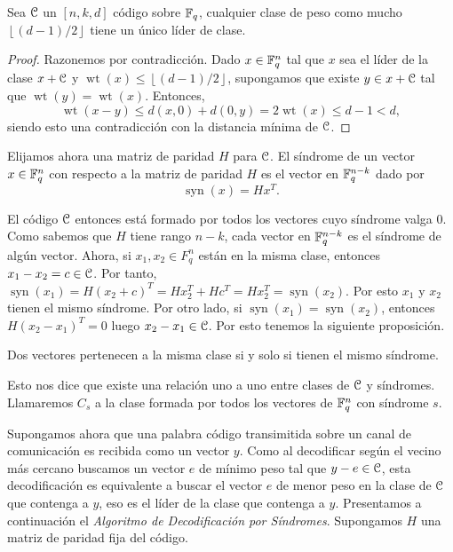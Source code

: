 \begin{proposition}
Sea \(\mathcal{C}\) un  \([n,k,d]\) código sobre \(\mathbb{F}_q\), cualquier clase de peso como mucho \(\left\lfloor (d-1) / 2 \right\rfloor\) tiene un único líder de clase.
\end{proposition}
\begin{proof}
Razonemos por contradicción. Dado \(x \in \mathbb{F}_q^{n}\) tal que \(x\) sea el líder de la clase \(x + \mathcal{C}\) y \(\operatorname{wt}(x) \le \left\lfloor (d-1) / 2 \right\rfloor\), supongamos que existe \(y  \in x + \mathcal{C}\) tal que \(\operatorname{wt}(y) = \operatorname{wt}(x) \). Entonces,
\[
\operatorname{wt}(x-y) \le d(x,0) + d(0,y) = 2 \operatorname{wt}(x) \le d-1 < d
,\]
siendo esto una contradicción con la distancia mínima de \(\mathcal{C}\).
\end{proof}

Elijamos ahora una matriz de paridad \(H\) para \(\mathcal{C}\). El síndrome de un vector \(x \in \mathbb{F}_q^{n}\) con respecto a la matriz de paridad \(H\) es el vector en  \(\mathbb{F}_q^{n-k}\) dado por
\[
\operatorname{syn}(x) = Hx^{T}
.\]

El código \(\mathcal{C}\) entonces está formado por todos los vectores cuyo síndrome valga \(0\). Como sabemos que \(H\) tiene rango \(n-k\), cada vector en \(\mathbb{F}_q^{n-k}\) es el síndrome de algún vector. Ahora, si \(x_1, x_2 \in F_q^{n}\) están en la misma clase, entonces \(x_1 - x_2 = c \in \mathcal{C}\). Por tanto, \(\operatorname{syn}(x_1) = H(x_2 + c)^{T} = Hx_2^{T} + Hc^{T} = Hx_2^{T} = \operatorname{syn}(x_2)\). Por esto \(x_1\) y \(x_2\) tienen el mismo síndrome. Por otro lado, si \(\operatorname{syn}(x_1) = \operatorname{syn}(x_2)\), entonces \(H(x_2 - x_1)^{T} = 0 \) luego \(x_2 - x_1 \in \mathcal{C}\). Por esto tenemos la siguiente proposición.

\begin{proposition}
    Dos vectores pertenecen a la misma clase si y solo si tienen el mismo síndrome.
\end{proposition}

Esto nos dice que existe una relación uno a uno entre clases de \(\mathcal{C}\) y síndromes. Llamaremos \(C_s\) a la clase formada por todos los vectores de  \(\mathbb{F}_q^{n}\) con síndrome \(s\).

Supongamos ahora que una palabra código transimitida sobre un canal de comunicación es recibida como un vector \(y\). Como al decodificar según el vecino más cercano buscamos un vector \(e\) de mínimo peso tal que \(y-e \in \mathcal{C}\), esta decodificación es equivalente a buscar el vector \(e\) de menor peso en la clase de \(\mathcal{C}\) que contenga a \(y\), eso es el líder de la clase que contenga a \(y\). Presentamos a continuación el \textit{Algoritmo de Decodificación por Síndromes}. Supongamos \(H\) una matriz de paridad fija del código.

